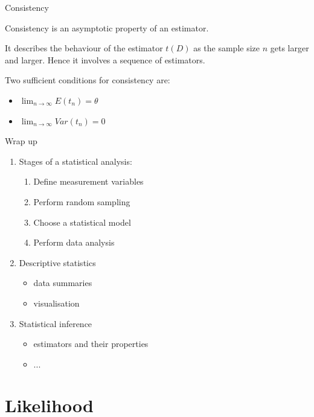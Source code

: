 \documentclass{beamer}
\begin{document}
\begin{frame}{Consistency}

	Consistency is an asymptotic property of an estimator.

	\vskip 0.5cm

	It describes the behaviour of the estimator $t(D)$ as the sample size $n$ gets
	larger and larger. Hence it involves a sequence of estimators.

	\vskip 0.5cm

	Two sufficient conditions for consistency are:
	\begin{itemize}
		\item $ \lim_{n \rightarrow \infty} E(t_n)=\theta $
		\item $ \lim_{n \rightarrow \infty} Var(t_n)=0 $
	\end{itemize}

\end{frame}

\begin{frame}{Wrap up}

	\begin{enumerate}
		\item Stages of a statistical analysis:
			\begin{enumerate}
				\item Define measurement variables
				\item Perform random sampling 
				\item Choose a statistical model
				\item Perform data analysis
			\end{enumerate}
		\item Descriptive statistics
			\begin{itemize}
				\item data summaries
				\item visualisation
			\end{itemize}
		\item Statistical inference
			\begin{itemize}
				\item estimators and their properties
				\item ...
			\end{itemize}
	\end{enumerate}

\end{frame}

\section{Likelihood}
\end{document}
